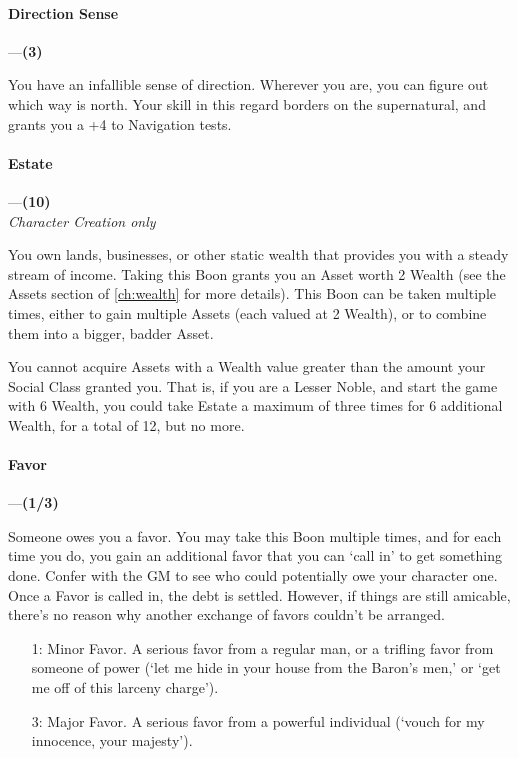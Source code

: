 \documentclass[oneside,11pt,english]{book}
\begin{document}
\paragraph{\label{boon:Direction Sense}Direction Sense}---\quad\textbf{(3)}\par
You have an infallible sense of direction. Wherever you are, you can figure out which way is north. Your skill in this regard borders on the supernatural, and grants you a +4 to Navigation tests.
\paragraph{\label{boon:Estate}Estate}---\quad\textbf{(10)}\\
\textit{Character Creation only}\par
You own lands, businesses, or other static wealth that provides you with a steady stream of income. 
Taking this Boon grants you an Asset worth 2 Wealth (see the Assets section of \autoref{ch:wealth} for more 
details). This Boon can be taken multiple times, either to gain multiple Assets (each valued at 2 Wealth), 
or to combine them into a bigger, badder Asset. 

You cannot acquire Assets with a Wealth value greater than the amount your Social Class granted you. 
That is, if you are a Lesser Noble, and start the game with 6 Wealth, you could take Estate a maximum of 
three times for 6 additional Wealth, for a total of 12, but no more. 
\paragraph{\label{boon:Favor}Favor}---\quad\textbf{(1/3)}\par
Someone owes you a favor. You may take this Boon multiple times, and for each time you do, you gain 
an additional favor that you can ‘call in’ to get something done. Confer with the GM to see who could 
potentially owe your character one. Once a Favor is called in, the debt is settled. However, if things are 
still amicable, there's no reason why another exchange of favors couldn't be arranged. 
	\begin{itemize}
		\item [1:] Minor Favor. A serious favor from a regular man, or a trifling favor from someone of power (‘let me hide in your house from the Baron's men,’ or ‘get me off of this larceny charge’).
		\item [3:] Major Favor. A serious favor from a powerful individual (‘vouch for my innocence, your majesty’).
	\end{itemize}
\end{document}
